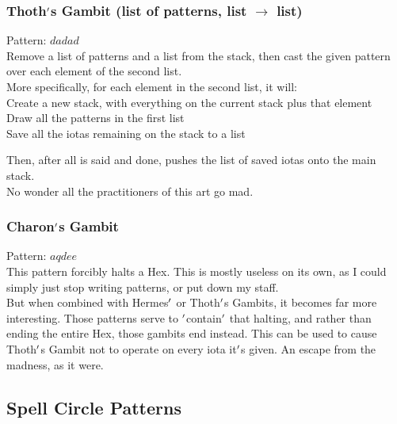 \documentclass[12pt]{article}
\begin{document}
  \label{sec: patterns/meta@hexcasting:for_each}
\subsubsection*{Thoth$\rq$s Gambit (list of patterns, list $\rightarrow$ list)}

    Pattern: $dadad$\\
      Remove a list of patterns and a list from the stack, then cast the given pattern over each element of the second list.\\


  
    More specifically, for each element in the second list, it will:\\Create a new stack, with everything on the current stack plus that element\\Draw all the patterns in the first list\\Save all the iotas remaining on the stack to a list

Then, after all is said and done, pushes the list of saved iotas onto the main stack.\\No wonder all the practitioners of this art go mad.\\


  \label{sec: patterns/meta@hexcasting:halt}
\subsubsection*{Charon$\rq$s Gambit}

    Pattern: $aqdee$\\
      This pattern forcibly halts a Hex. This is mostly useless on its own, as I could simply just stop writing patterns, or put down my staff.\\


  
    But when combined with Hermes$\rq$ or Thoth$\rq$s Gambits, it becomes far more interesting. Those patterns serve to $\rq$contain$\rq$ that halting, and rather than ending the entire Hex, those gambits end instead. This can be used to cause Thoth$\rq$s Gambit not to operate on every iota it$\rq$s given. An escape from the madness, as it were.\\

\newpage

\label{sec:patterns/circle}
\subsection*{Spell Circle Patterns}
\end{document}
